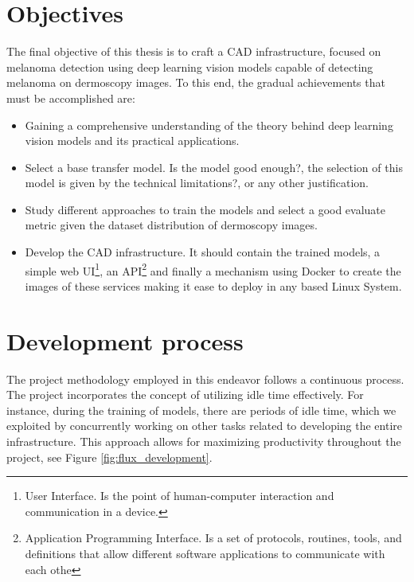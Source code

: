 \newpage

\section{Objectives}

The final objective of this thesis is to craft a CAD infrastructure,
focused on melanoma detection using deep learning vision models capable of detecting melanoma on dermoscopy images. To this end, the gradual achievements that
must be accomplished are:

\begin{itemize}

  \item Gaining a comprehensive understanding of the theory
    behind deep learning vision models and its practical applications.

   \item Select a base transfer model. Is the model good enough?, the selection of this model is given by the technical limitations?, or any other justification.

  \item Study different approaches to train the models and select a good  evaluate metric given the dataset distribution of dermoscopy images.

  \item  Develop the CAD infrastructure. It should contain
    the  trained models, a simple web UI\footnote{User Interface. Is
    the point of human-computer interaction and communication in a device.}, an
    API\footnote{Application Programming Interface. Is a set of protocols,
      routines, tools, and definitions that allow different software applications
    to communicate with each othe} and finally a mechanism using Docker to create
    the images of these services making it ease to deploy in any based Linux System.

\end{itemize}


\section{Development process}

The project methodology employed in this endeavor follows a continuous process.
The project incorporates the concept of utilizing idle time effectively. For
instance, during the training of models, there are periods of idle time, which
we exploited by concurrently working on other tasks related to developing the
entire infrastructure. This approach allows for maximizing productivity
throughout the project, see Figure \ref{fig:flux_development}.


